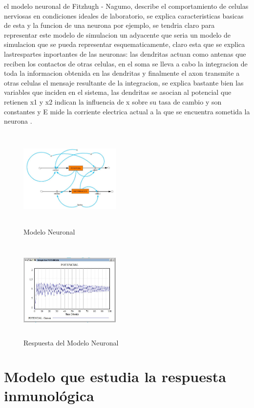 \documentclass[12pt,letterpaper]{article}
\begin{document}
el modelo neuronal de Fitzhugh - Nagumo, describe el comportamiento de celulas nerviosas en condiciones ideales de laboratorio, se explica caracteristicas basicas de esta y  la funcion de una neurona por ejemplo, se tendria claro para representar este modelo de simulacion un adyacente que seria un modelo de simulacion que se pueda representar esquematicamente, claro esta que se explica lastrespartes inportantes de las neuronas:  las dendritas actuan como antenas que reciben los contactos de otras celulas,  en el soma se lleva a cabo la integracion de toda la informacion obtenida en las dendritas y finalmente el axon transmite a otras celulas el mensaje resultante de la integracion, se explica bastante bien las variables que inciden en el sistema, las dendritas se asocian al potencial que retienen x1 y x2 indican la influencia de x sobre su tasa de cambio y son constantes y E mide la corriente electrica actual a la que se encuentra sometida la neurona .\\

\begin{figure}
\centering
\includegraphics[width=5cm, height=5cm]{1.JPG}
\caption{\label{fig: } Modelo Neuronal }
\end{figure}

\begin{figure}
\centering
\includegraphics[width=5cm, height=5cm]{2.JPG}
\caption{\label{fig: }  Respuesta del Modelo Neuronal }
\end{figure}

\section{Modelo que estudia la respuesta inmunológica}
\end{document}
